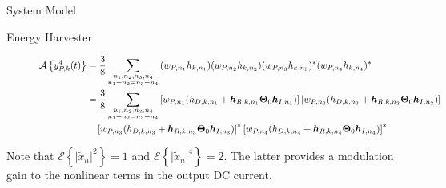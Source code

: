 \documentclass{IEEEtran}
\begin{document}
\begin{section} {System Model}
\begin{subsection}	{Energy Harvester}
\begin{figure*}[b]
\begin{align}
				\mathcal{A}\left\{y_{P,k}^4(t)\right\}
				 & =\frac{3}{8}\sum_{\substack{{n_1},{n_2},{n_3},{n_4}\\{n_1}+{n_2}={n_3}+{n_4}}}{(w_{P,{n_1}}h_{k,{n_1}})(w_{P,{n_2}}h_{k,{n_2}})(w_{P,{n_3}}h_{k,{n_3}})^*(w_{P,{n_4}}h_{k,{n_4}})^*}                                                                                                                      \\
				 & =\frac{3}{8}\sum_{\substack{{n_1},{n_2},{n_3},{n_4}\\{n_1}+{n_2}={n_3}+{n_4}}}\left[w_{P,{n_1}}(h_{D,k,n_1}+\boldsymbol{h}_{R,k,n_1}\boldsymbol{\Theta}_0\boldsymbol{h}_{I,n_1})\right]\left[w_{P,{n_2}}(h_{D,k,n_2}+\boldsymbol{h}_{R,k,n_2}\boldsymbol{\Theta}_0\boldsymbol{h}_{I,n_2})\right]\nonumber \\
				 & \quad\left[w_{P,{n_3}}(h_{D,k,n_3}+\boldsymbol{h}_{R,k,n_3}\boldsymbol{\Theta}_0\boldsymbol{h}_{I,n_3})\right]^*\left[w_{P,{n_4}}(h_{D,k,n_4}+\boldsymbol{h}_{R,k,n_4}\boldsymbol{\Theta}_0\boldsymbol{h}_{I,n_4})\right]^*\label{eq:A{y_{P,k}**4'}}
			\end{align}
		\end{figure*}
		Note that $\mathcal{E}\left\{\lvert\tilde{x}_n\rvert^2\right\}=1$ and $\mathcal{E}\left\{\lvert\tilde{x}_n\rvert^4\right\}=2$. The latter provides a modulation gain to the nonlinear terms in the output DC current.


	\end{subsection}
\end{section}



\end{document}
